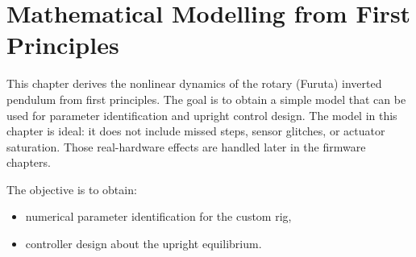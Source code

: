 \chapter{Mathematical Modelling from First Principles}
\label{ch:modelling}

This chapter derives the nonlinear dynamics of the rotary (Furuta) inverted pendulum from first principles. The goal is to obtain a simple model that can be used for parameter identification and upright control design. The model in this chapter is ideal: it does not include missed steps, sensor glitches, or actuator saturation. Those real-hardware effects are handled later in the firmware chapters.

The objective is to obtain:
\begin{itemize}
  \item numerical parameter identification for the custom rig,
  \item controller design about the upright equilibrium.
\end{itemize}

